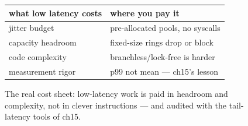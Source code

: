 \begin{figure}[htbp]
\centering
\begin{tabular}{ll}
\toprule
what low latency costs & where you pay it \\
\midrule
jitter budget & pre-allocated pools, no syscalls \\
capacity headroom & fixed-size rings drop or block \\
code complexity & branchless/lock-free is harder \\
measurement rigor & p99 not mean --- ch15's lesson \\
\bottomrule
\end{tabular}
\caption{The real cost sheet: low-latency work is paid in headroom
and complexity, not in clever instructions --- and audited with
the tail-latency tools of ch15.}
\label{fig:cost17}
\end{figure}
